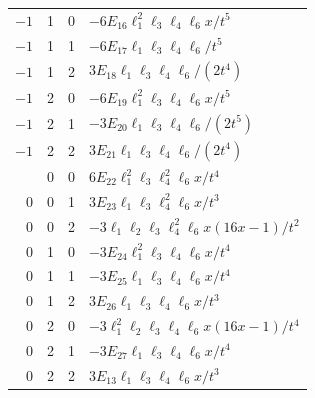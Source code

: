 \documentclass[11pt]{article}
\numberwithin{equation}{section}
\begin{document}
{\begin{longtable}{@{}rrr l@{}}
$-1$&1&0&$-6E_{16}\ell_1^2\ell_3\ell_4\ell_6x/t^5$\\
$-1$&1&1&$-6E_{17}\ell_1\ell_3\ell_4\ell_6/t^5$\\
$-1$&1&2&$3E_{18}\ell_1\ell_3\ell_4\ell_6/(2t^4)$\\
$-1$&2&0&$-6E_{19}\ell_1^2\ell_3\ell_4\ell_6x/t^5$\\
$-1$&2&1&$-3E_{20}\ell_1\ell_3\ell_4\ell_6/(2t^5)$\\
$-1$&2&2&$3E_{21}\ell_1\ell_3\ell_4\ell_6/(2t^4)$\\\addlinespace
0&0&0&$6E_{22}\ell_1^2\ell_3\ell_4^2\ell_6x/t^4$\\
0&0&1&$3E_{23}\ell_1\ell_3\ell_4^2\ell_6x/t^3$\\
0&0&2&$-3\ell_1\ell_2\ell_3\ell_4^2\ell_6x(16x-1)/t^2$\\
0&1&0&$-3E_{24}\ell_1^2\ell_3\ell_4\ell_6x/t^4$\\
0&1&1&$-3E_{25}\ell_1\ell_3\ell_4\ell_6x/t^4$\\
0&1&2&$3E_{26}\ell_1\ell_3\ell_4\ell_6x/t^3$\\
0&2&0&$-3\ell_1^2\ell_2\ell_3\ell_4\ell_6x(16x-1)/t^4$\\
0&2&1&$-3E_{27}\ell_1\ell_3\ell_4\ell_6x/t^4$\\
0&2&2&$3E_{13}\ell_1\ell_3\ell_4\ell_6x/t^3$\\
\bottomrule
\end{longtable}}
\end{document}
